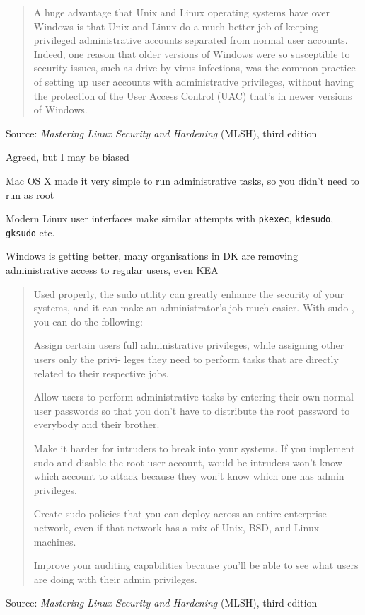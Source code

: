 \documentclass[Screen16to9,17pt]{foils}
\begin{document}


\begin{quote}
A huge advantage that Unix and Linux operating systems have over Windows is that Unix and Linux do
a much better job of keeping privileged administrative accounts separated from normal user accounts.
Indeed, one reason that older versions of Windows were so susceptible to security issues, such as
drive-by virus infections, was the common practice of setting up user accounts with administrative
privileges, without having the protection of the User Access Control (UAC) that’s in newer versions of
Windows.
\end{quote}
Source: \emph{Mastering Linux Security and Hardening} (MLSH), third edition

\begin{list2}
\item Agreed, but I may be biased
\item Mac OS X made it very simple to run administrative tasks, so you didn't need to run as root
\item Modern Linux user interfaces make similar attempts with \verb+pkexec+, \verb+kdesudo+,  \verb+gksudo+ etc.
\item Windows is getting better, many organisations in DK are removing administrative access to regular users, even KEA
\end{list2}



\begin{quote}
Used properly, the sudo utility can greatly enhance the security of your systems, and it can make an
administrator’s job much easier. With sudo , you can do the following:
\begin{list2}
\item Assign certain users full administrative privileges, while assigning other users only the privi-
leges they need to perform tasks that are directly related to their respective jobs.
\item Allow users to perform administrative tasks by entering their own normal user passwords so
that you don’t have to distribute the root password to everybody and their brother.
\item Make it harder for intruders to break into your systems. If you implement sudo and disable
the root user account, would-be intruders won’t know which account to attack because they
won’t know which one has admin privileges.
\item Create sudo policies that you can deploy across an entire enterprise network, even if that
network has a mix of Unix, BSD, and Linux machines.
\item Improve your auditing capabilities because you’ll be able to see what users are doing with
their admin privileges.
\end{list2}
\end{quote}
Source: \emph{Mastering Linux Security and Hardening} (MLSH), third edition
\end{document}

